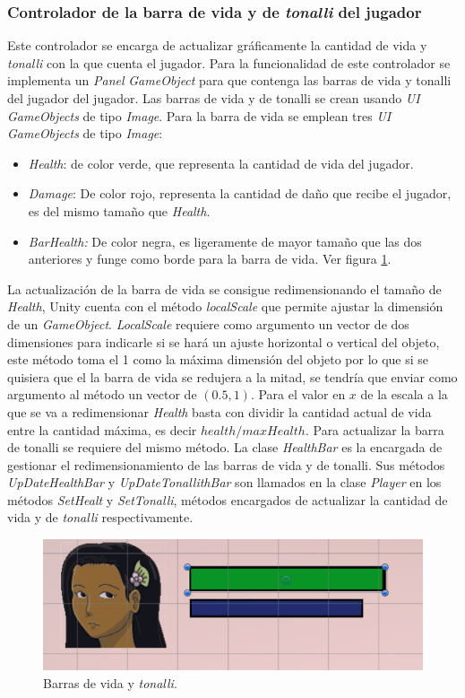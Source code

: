 \subsubsection{Controlador de la barra de vida y de \textit{tonalli} del jugador}
Este controlador se encarga de actualizar gráficamente la cantidad de vida y 
\textit{tonalli} con la que cuenta el jugador. Para la funcionalidad de este 
controlador se implementa un \textit{Panel} \textit{GameObject} para que 
contenga las barras de vida y tonalli del jugador del jugador. Las barras de 
vida y de tonalli se crean usando \textit{UI GameObjects} de tipo 
\textit{Image}. Para la barra de vida se emplean tres \textit{UI GameObjects} de 
tipo \textit{Image}:  
	\begin{itemize}
		\item \textit{Health}: de color verde, que representa la cantidad de 
		vida del jugador.
		\item \textit{Damage}: De color rojo, representa la cantidad de daño que 
		recibe el jugador, es del mismo tamaño que \textit{Health}.
		\item \textit{BarHealth:} De color negra, es ligeramente de mayor tamaño 
		que las dos anteriores y funge como borde para la barra de vida. Ver figura  \ref{fig:HealthBar}.
	\end{itemize}
La actualización de la barra de vida se consigue redimensionando el tamaño de 
\textit{Health}, Unity cuenta con el método \textit{localScale} que permite 
ajustar la dimensión de un \textit{GameObject}. \textit{LocalScale} requiere 
como argumento un vector de dos dimensiones para indicarle si se hará un ajuste 
horizontal o vertical del objeto, este método toma el 1 como la máxima dimensión 
del objeto por lo que si se quisiera que el la barra de vida se redujera a la 
mitad, se tendría que enviar como argumento al método un vector de $(0.5, 1)$. 
Para el valor en $x$ de la escala a la que se va a redimensionar \textit{Health} 
basta con dividir la cantidad actual de vida entre la cantidad máxima, es decir 
$health/maxHealth$. Para actualizar la barra de tonalli se requiere del mismo 
método. La clase \textit{HealthBar} es la encargada de gestionar el 
redimensionamiento de las barras de vida y de tonalli. Sus métodos 
\textit{UpDateHealthBar} y \textit{UpDateTonallithBar} son llamados en la clase 
\textit{Player} en los métodos \textit{SetHealt} y \textit{SetTonalli}, métodos 
encargados de actualizar la cantidad de vida y de \textit{tonalli} 
respectivamente. 

	\begin{figure}[h]
		\centering
		\includegraphics[height=0.1 \textheight]{03TrabajoRealizado/imagenes/attributesBar.png}
		\caption{Barras de vida y \textit{tonalli}.}
		\label{fig:HealthBar}
	\end{figure} 
	

